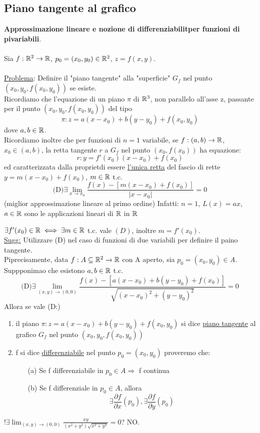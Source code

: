 \subsection{Piano tangente al grafico}
\textbf{Approssimazione lineare e nozione di differenziabilit\aca per funzioni di pi\acu variabili}. \\\\
Sia $f:\mathbb{R}^2 \to \mathbb{R}$, $p_0 = (x_0,y_0) \in \mathbb{R}^2$, $z=f(x,y)$. \\\\
\underline{Problema}: Definire il "piano tangente" alla "superficie" $G_f$ nel punto $(x_0,y_0,f(x_0,y_0))$ se esiste.\\
Ricordiamo che l'equazione di un piano $\pi$ di $\mathbb{R}^3$, non parallelo all'asse z, passante per il punto 
$(x_0,y_0,f(x_0,y_0))$ \ace del tipo 
$$\pi : z = a(x-x_0) + b(y-y_0) + f(x_0,y_0)$$
dove $a,b \in \mathbb{R}$.\\
Ricordiamo inoltre che per funzioni di $n=1$ variabile, se $f:(a,b) \to \mathbb{R}$, $x_0\in (a,b)$, la retta tangente $r$ a 
$G_f$ nel punto $(x_0,f(x_0))$ ha equazione:
$$r: y = f'(x_0)(x-x_0) + f(x_0)$$
ed \ace caratterizzata dalla propriet\aca di essere \underline{l'unica retta} del fascio di rette $y=m(x-x_0)+f(x_0)$, 
$m\in\mathbb{R}$ t.c. 
$$\text{(D)} \exists \lim_{x\to x_0}\frac{f(x)-\left[m(x-x_0)+f(x_0)\right]}{\lvert x-x_0\rvert} = 0$$
(miglior approssimazione lineare al primo ordine)
Infatti: $n=1$, $L(x) = ax$, $a\in\mathbb{R}$ sono le applicazioni lineari di $\mathbb{R}$ in $\mathbb{R}$
\begin{exercise}
  $\exists f'(x_0) \in \mathbb{R} \iff \exists m \in \mathbb{R}$ t.c. vale $(D)$, inoltre $m = f'(x_0)$. \\
  \underline{Sugg:} Utilizzare (D) nel caso di funzioni di due variabili per definire il paino tangente. \\
  Pi\acu precisamente, data $f: A \subseteq \mathbb{R}^2 \to \mathbb{R}$ con A aperto, sia $p_0=(x_0,y_0)\in A$. Suppponimao che esistono $a,b \in \mathbb{R}$ t.c.
  $$\text{(D)} \exists \lim_{(x,y)\to (0,0)}\frac{f(x)-\left[a(x-x_0)+b(y-y_0)+f(x_0)\right]}{\sqrt{(x-x_0)^2+(y-y_0)^2}} = 0$$
  Allora se vale (D:)
\end{exercise}
\begin{definition}
  \begin{enumerate}
    \item il piano $\pi : z = a(x-x_0)+b(y-y_0)+f(x_0,y_0)$ si dice \underline{piano tangente} al grafico $G_f$ nel punto $\left(x_0,y_0,f(x_0,y_0)\right)$
    \item f si dice \underline{differenziabile} nel punto $p_0 = (x_0,y_0)$ proveremo che:
      \begin{enumerate}
        \item[(a)] Se f \ace differenziabile in $p_0 \in A \Rightarrow $ f \ace continua
        \item[(b)] Se f \ace differenziale in $p_0 \in A$, allora 
                   $$\exists \frac{\partial f}{\partial x}(p_0), \exists \frac{\partial f}{\partial y}(p_0)$$   
      \end{enumerate}
  \end{enumerate}
\end{definition}
\begin{exercise}
  $!\exists \lim_{(x,y) \to (0,0)} \frac{xy}{(x^2+y^2)\sqrt{x^2+y^2}} = 0$? NO.
\end{exercise}
